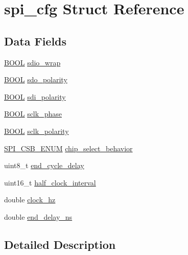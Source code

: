 \hypertarget{structspi__cfg}{\section{spi\+\_\+cfg Struct Reference}
\label{structspi__cfg}
}
\subsection*{Data Fields}
\begin{DoxyCompactItemize}
\item 
\hyperlink{idi_8c_a050c65e107f0c828f856a231f4b4e788}{B\+O\+O\+L} \hyperlink{structspi__cfg_a7cd0897d273b604ea90aaf525ca5d318}{sdio\+\_\+wrap}
\item 
\hyperlink{idi_8c_a050c65e107f0c828f856a231f4b4e788}{B\+O\+O\+L} \hyperlink{structspi__cfg_abbceffb19dd814b30b890c4c3710a229}{sdo\+\_\+polarity}
\item 
\hyperlink{idi_8c_a050c65e107f0c828f856a231f4b4e788}{B\+O\+O\+L} \hyperlink{structspi__cfg_a010045ad60dc510daa368259399de229}{sdi\+\_\+polarity}
\item 
\hyperlink{idi_8c_a050c65e107f0c828f856a231f4b4e788}{B\+O\+O\+L} \hyperlink{structspi__cfg_a2613a037b4632a6d74e89aeb62d12344}{sclk\+\_\+phase}
\item 
\hyperlink{idi_8c_a050c65e107f0c828f856a231f4b4e788}{B\+O\+O\+L} \hyperlink{structspi__cfg_a08a45f7aec9d8b6e59e91a56dc889384}{sclk\+\_\+polarity}
\item 
\hyperlink{idi_8c_a4715fd103e903bf93238963a9623101d}{S\+P\+I\+\_\+\+C\+S\+B\+\_\+\+E\+N\+U\+M} \hyperlink{structspi__cfg_aede15f437dcd3a33a5605c71b3bf3801}{chip\+\_\+select\+\_\+behavior}
\item 
uint8\+\_\+t \hyperlink{structspi__cfg_a0b6f06a341aa4e9fbbbb33b417b5f722}{end\+\_\+cycle\+\_\+delay}
\item 
uint16\+\_\+t \hyperlink{structspi__cfg_ad8d6adceadaec7f4c92349ec8beb720d}{half\+\_\+clock\+\_\+interval}
\item 
double \hyperlink{structspi__cfg_aaed71f77ad7200a8f4bf0f1cdd0fb328}{clock\+\_\+hz}
\item 
double \hyperlink{structspi__cfg_adc10d917ca7551b41164711a54684a51}{end\+\_\+delay\+\_\+ns}
\end{DoxyCompactItemize}


\subsection{Detailed Description}


